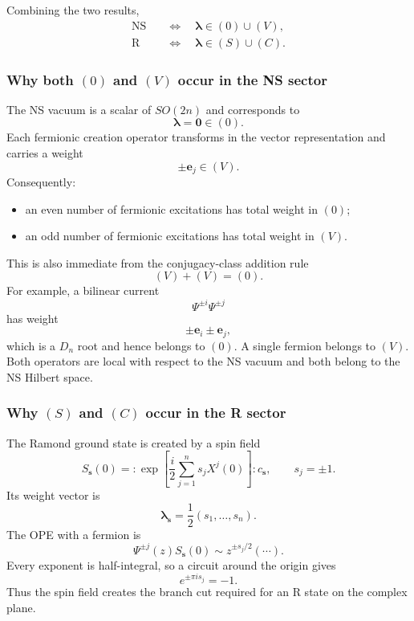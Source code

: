 \documentclass[
  10pt,
  a4paper,
  openany]{book}
\providecommand{\tightlist}{%
  \setlength{\itemsep}{0pt}\setlength{\parskip}{0pt}}
\begin{document}
Combining the two results, \[
\boxed{
\begin{aligned}
\mathrm{NS}
&\quad\Longleftrightarrow\quad
\boldsymbol\lambda\in(0)\cup(V),\\%
\mathrm R
&\quad\Longleftrightarrow\quad
\boldsymbol\lambda\in(S)\cup(C).
\end{aligned}
}
\]

\subsubsection{\texorpdfstring{Why both \((0)\) and \((V)\) occur in the
NS
sector}{Why both (0) and (V) occur in the NS sector}}\label{why-both-0-and-v-occur-in-the-ns-sector}

The NS vacuum is a scalar of \(SO(2n)\) and corresponds to \[
\boldsymbol\lambda=\mathbf0\in(0).
\] Each fermionic creation operator transforms in the vector
representation and carries a weight \[
\pm\mathbf e_j\in(V).
\] Consequently:

\begin{itemize}
\tightlist
\item
  an even number of fermionic excitations has total weight in \((0)\);
\item
  an odd number of fermionic excitations has total weight in \((V)\).
\end{itemize}

This is also immediate from the conjugacy-class addition rule \[
(V)+(V)=(0).
\] For example, a bilinear current \[
\Psi^{\pm i}\Psi^{\pm j}
\] has weight \[
\pm\mathbf e_i\pm\mathbf e_j,
\] which is a \(D_n\) root and hence belongs to \((0)\). A single
fermion belongs to \((V)\). Both operators are local with respect to the
NS vacuum and both belong to the NS Hilbert space.

\subsubsection{\texorpdfstring{Why \((S)\) and \((C)\) occur in the R
sector}{Why (S) and (C) occur in the R sector}}\label{why-s-and-c-occur-in-the-r-sector}

The Ramond ground state is created by a spin field \[
S_{\mathbf s}(0)
=
:\!\exp\left[
\frac{i}{2}
\sum_{j=1}^n s_jX^j(0)
\right]\!:c_{\mathbf s},
\qquad
s_j=\pm1.
\] Its weight vector is \[
\boldsymbol\lambda_{\mathbf s}
=
\frac12(s_1,\ldots,s_n).
\] The OPE with a fermion is \[
\Psi^{\pm j}(z)S_{\mathbf s}(0)
\sim
z^{\pm s_j/2}(\cdots).
\] Every exponent is half-integral, so a circuit around the origin gives
\[
e^{\pm\pi i s_j}=-1.
\] Thus the spin field creates the branch cut required for an R state on
the complex plane.
\end{document}

